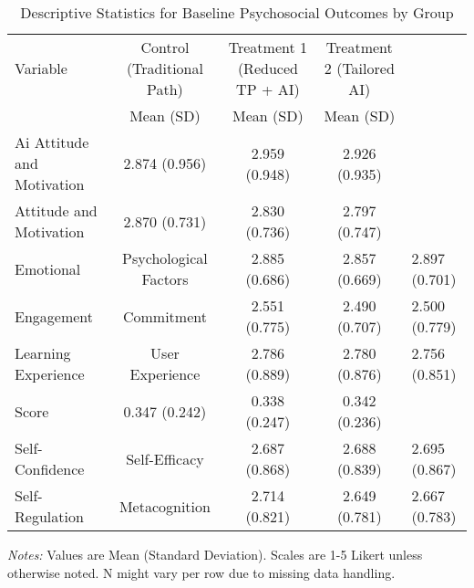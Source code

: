 \begin{table}[htbp]
\centering
\begin{threeparttable}
\caption{Descriptive Statistics for Baseline Psychosocial Outcomes by Group}
\label{tab:baseline_outcomes_balance_paper_generated}
\scriptsize
\begin{tabular}{@{}lccc@{}}
\toprule
Variable & Control (Traditional Path) & Treatment 1 (Reduced TP + AI) & Treatment 2 (Tailored AI) \\
 & Mean (SD) & Mean (SD) & Mean (SD)  \\
\midrule
Ai Attitude and Motivation & 2.874 (0.956) & 2.959 (0.948) & 2.926 (0.935)  \\
Attitude and Motivation & 2.870 (0.731) & 2.830 (0.736) & 2.797 (0.747)  \\
Emotional & Psychological Factors & 2.885 (0.686) & 2.857 (0.669) & 2.897 (0.701)  \\
Engagement & Commitment & 2.551 (0.775) & 2.490 (0.707) & 2.500 (0.779)  \\
Learning Experience & User Experience & 2.786 (0.889) & 2.780 (0.876) & 2.756 (0.851)  \\
Score & 0.347 (0.242) & 0.338 (0.247) & 0.342 (0.236)  \\
Self-Confidence & Self-Efficacy & 2.687 (0.868) & 2.688 (0.839) & 2.695 (0.867)  \\
Self-Regulation & Metacognition & 2.714 (0.821) & 2.649 (0.781) & 2.667 (0.783)  \\
\bottomrule
\end{tabular}
\begin{tablenotes}
  \item[] \textit{Notes:} Values are Mean (Standard Deviation). Scales are 1-5 Likert unless otherwise noted. N might vary per row due to missing data handling.
\end{tablenotes}
\end{threeparttable}
\end{table}
